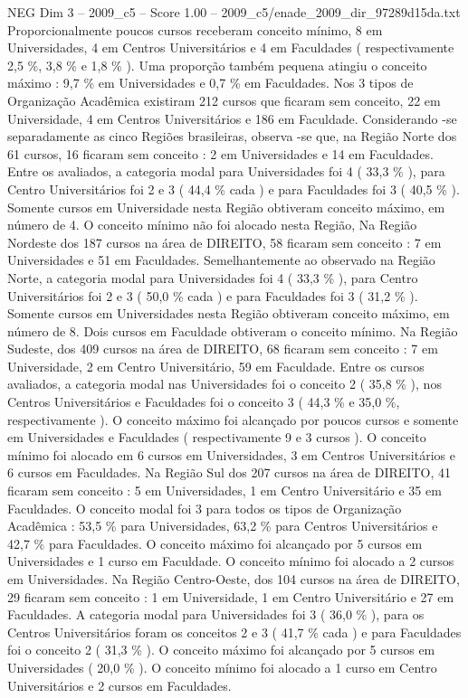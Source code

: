 \begin{textsample}{NEG Dim 3 – 2009\_c5 – Score 1.00 – 2009\_c5/enade\_2009\_dir\_97289d15da.txt}
Proporcionalmente poucos cursos receberam conceito mínimo, 8 em Universidades, 4 em Centros Universitários e 4 em Faculdades ( respectivamente 2,5 \%, 3,8 \% e 1,8 \% ).
Uma proporção também pequena atingiu o conceito máximo : 9,7 \% em Universidades e 0,7 \% em Faculdades.
Nos 3 tipos de Organização Acadêmica existiram 212 cursos que ficaram sem conceito, 22 em Universidade, 4 em Centros Universitários e 186 em Faculdade.
Considerando -se separadamente as cinco Regiões brasileiras, observa -se que, na Região Norte dos 61 cursos, 16 ficaram sem conceito : 2 em Universidades e 14 em Faculdades.
Entre os avaliados, a categoria modal para Universidades foi 4 ( 33,3 \% ), para Centro Universitários foi 2 e 3 ( 44,4 \% cada ) e para Faculdades foi 3 ( 40,5 \% ).
Somente cursos em Universidade nesta Região obtiveram conceito máximo, em número de 4.
O conceito mínimo não foi alocado nesta Região, Na Região Nordeste dos 187 cursos na área de DIREITO, 58 ficaram sem conceito : 7 em Universidades e 51 em Faculdades.
Semelhantemente ao observado na Região Norte, a categoria modal para Universidades foi 4 ( 33,3 \% ), para Centro Universitários foi 2 e 3 ( 50,0 \% cada ) e para Faculdades foi 3 ( 31,2 \% ).
Somente cursos em Universidades nesta Região obtiveram conceito máximo, em número de 8.
Dois cursos em Faculdade obtiveram o conceito mínimo.
Na Região Sudeste, dos 409 cursos na área de DIREITO, 68 ficaram sem conceito : 7 em Universidade, 2 em Centro Universitário, 59 em Faculdade.
Entre os cursos avaliados, a categoria modal nas Universidades foi o conceito 2 ( 35,8 \% ), nos Centros Universitários e Faculdades foi o conceito 3 ( 44,3 \% e 35,0 \%, respectivamente ).
O conceito máximo foi alcançado por poucos cursos e somente em Universidades e Faculdades ( respectivamente 9 e 3 cursos ).
O conceito mínimo foi alocado em 6 cursos em Universidades, 3 em Centros Universitários e 6 cursos em Faculdades.
Na Região Sul dos 207 cursos na área de DIREITO, 41 ficaram sem conceito : 5 em Universidades, 1 em Centro Universitário e 35 em Faculdades.
O conceito modal foi 3 para todos os tipos de Organização Acadêmica : 53,5 \% para Universidades, 63,2 \% para Centros Universitários e 42,7 \% para Faculdades.
O conceito máximo foi alcançado por 5 cursos em Universidades e 1 curso em Faculdade.
O conceito mínimo foi alocado a 2 cursos em Universidades.
Na Região Centro-Oeste, dos 104 cursos na área de DIREITO, 29 ficaram sem conceito : 1 em Universidade, 1 em Centro Universitário e 27 em Faculdades.
A categoria modal para Universidades foi 3 ( 36,0 \% ), para os Centros Universitários foram os conceitos 2 e 3 ( 41,7 \% cada ) e para Faculdades foi o conceito 2 ( 31,3 \% ).
O conceito máximo foi alcançado por 5 cursos em Universidades ( 20,0 \% ).
O conceito mínimo foi alocado a 1 curso em Centro Universitários e 2 cursos em Faculdades.

\end{textsample}

